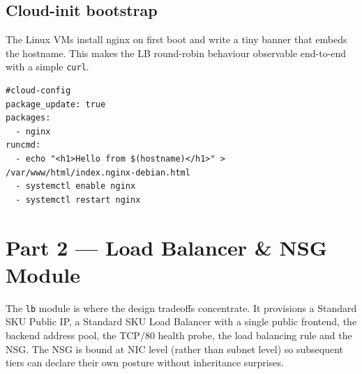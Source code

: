 \documentclass[10pt,a4paper,twocolumn]{article}
\begin{document}
\subsection{Cloud-init bootstrap}

The Linux VMs install nginx on first boot and write a tiny banner that
embeds the hostname. This makes the LB round-robin behaviour observable
end-to-end with a simple \texttt{curl}.

\begin{lstlisting}[style=yamlcode, caption={\texttt{infra/cloud-init.yaml}: nginx installation with hostname banner}]
#cloud-config
package_update: true
packages:
  - nginx
runcmd:
  - echo "<h1>Hello from $(hostname)</h1>" > /var/www/html/index.nginx-debian.html
  - systemctl enable nginx
  - systemctl restart nginx
\end{lstlisting}

\section{Part 2 --- Load Balancer \& NSG Module}

The \texttt{lb} module is where the design tradeoffs concentrate. It
provisions a Standard SKU Public IP, a Standard SKU Load Balancer with a
single public frontend, the backend address pool, the TCP/80 health
probe, the load balancing rule and the NSG. The NSG is bound at NIC
level (rather than subnet level) so subsequent tiers can declare their
own posture without inheritance surprises.
\end{document}
